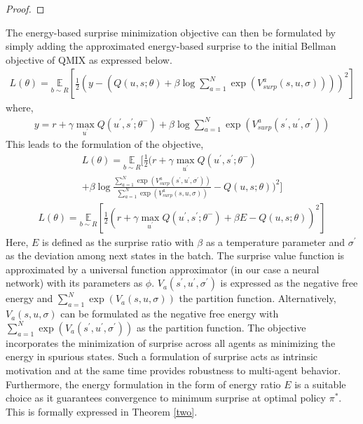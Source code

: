 \documentclass{article}
\begin{document}
\begin{multicols}{2}
\begin{proof}
  \end{proof}  
The energy-based surprise minimization objective can then be formulated by simply adding the approximated energy-based surprise to the initial Bellman objective \cite{rl} of QMIX as expressed below.
\begin{gather}
  L(\theta) = \underset{b \sim R}{\mathbb{E}}[\frac{1}{2}(y - (Q(u,s;\theta) + \beta \log \sum_{a=1}^{N} \exp{(V^{a}_{surp}(s,u,\sigma))}))^{2}] \nonumber
\end{gather}
where,
\begin{gather}
  y = r + \gamma \underset{u^{'}}{\max}Q(u^{'},s^{'};\theta^{-}) + \beta \log \sum_{a=1}^{N} \exp{(V^{a}_{surp}(s^{'},u^{'},\sigma^{'}))}
\end{gather}
This leads to the formulation of the objective,
\begin{multline}
    L(\theta )= \underset{b \sim R}{\mathbb{E}}[\frac{1}{2}(r + \gamma \underset{u^{'}}{\max}Q(u^{'},s^{'};\theta^{-})\\ + \beta \log \frac{\sum_{a=1}^{N} \exp{(V^{a}_{surp}(s^{'},u^{'},\sigma^{'}))}}{\sum_{a=1}^{N} \exp{(V^{a}_{surp}(s,u,\sigma))}} - Q(u,s;\theta))^{2}]
\end{multline}
\begin{gather}
  L(\theta) = \underset{b \sim R}{\mathbb{E}}[\frac{1}{2}(r + \gamma \underset{u^{'}}{\max}Q(u^{'},s^{'};\theta^{-}) + \beta E - Q(u,s;\theta))^{2}] \label{eq:3}
\end{gather}
Here, $E$ is defined as the surprise ratio with $\beta$ as a temperature parameter and $\sigma^{'}$ as the deviation among next states in the batch. The surprise value function is approximated by a universal function approximator (in our case a neural network) with its parameters as $\phi$. $V_{a}(s^{'},u^{'},\sigma^{'})$ is expressed as the negative free energy and $\sum_{a=1}^{N} \exp{(V_{a}(s,u,\sigma))}$ the partition function. Alternatively, $V_{a}(s,u,\sigma)$ can be formulated as the negative free energy with $\sum_{a=1}^{N} \exp{(V_{a}(s^{'},u^{'},\sigma^{'}))}$ as the partition function. The objective incorporates the minimization of surprise across all agents as minimizing the energy in spurious states. Such a formulation of surprise acts as intrinsic motivation \cite{curiosity} and at the same time provides robustness to multi-agent behavior. Furthermore, the energy formulation in the form of energy ratio $E$ is a suitable choice as it guarantees convergence to minimum surprise at optimal policy $\pi^{*}$. This is formally expressed in Theorem \autoref{two}.
\begin{customthm}{2}\label{two}

\end{customthm}
\end{multicols}
\end{document}
